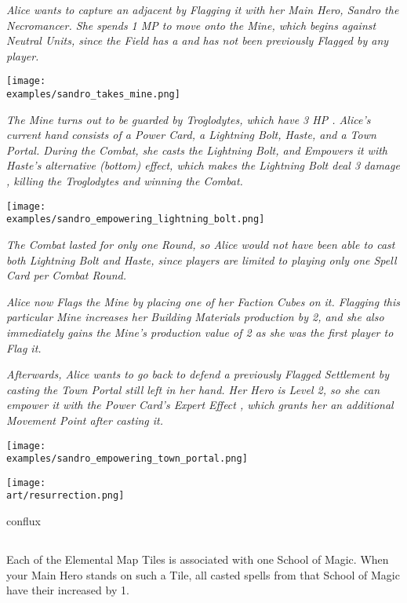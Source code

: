 \begin{multicols*}{2}

\textit{Alice wants to capture an adjacent  by Flagging it with her Main Hero, Sandro the Necromancer.
    She spends 1 MP to move onto the Mine, which begins  against Neutral Units, since the Field has a  and has not been previously Flagged by any player.}\par

\texttt{[image: \\examples/sandro\_takes\_mine.png]}

\textit{The Mine turns out to be guarded by Troglodytes, which have 3 HP .
Alice's current hand consists of a Power Card, a Lightning Bolt, Haste, and a Town Portal.
During the Combat, she casts the Lightning Bolt, and Empowers  it with Haste's alternative (bottom) effect, which makes the Lightning Bolt deal 3 damage , killing the Troglodytes and winning the Combat.}

\texttt{[image: \\examples/sandro\_empowering\_lightning\_bolt.png]}

\columnbreak
\textit{The Combat lasted for only one Round, so Alice would not have been able to cast both Lightning Bolt and Haste, since players are limited to playing only one Spell Card per Combat Round.}\par


\textit{Alice now Flags the Mine by placing one of her Faction Cubes on it.
    Flagging this particular Mine increases her Building Materials  production by 2, and she also immediately gains the Mine's production value of 2  as she was the first player to Flag it.}\par
\textit{Afterwards, Alice wants to go back to defend a previously Flagged Settlement by casting the Town Portal still left in her hand.
    Her Hero is Level 2, so she can empower it with the Power Card's Expert Effect , which grants her an additional Movement Point after casting it.
}

\texttt{[image: \\examples/sandro\_empowering\_town\_portal.png]}

\vfill
\hspace{2em}
{\texttt{[image: \\art/resurrection.png]}}

\begin{expansion}{conflux}
\subsection*{}
Each of the Elemental Map Tiles is associated with one School of Magic. When your Main Hero stands on such a Tile, all casted spells from that School of Magic have their  increased by 1. 
\end{expansion}


\end{multicols*}
